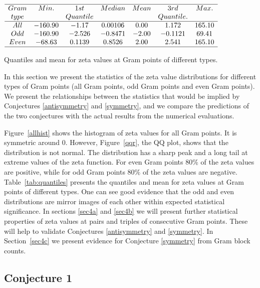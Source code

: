 \documentclass[twoside]{article}
\begin{document}
\begin{table}
\centering \(\begin{array}{ccccccc}
\hline
 Gram &     Min.   & 1st    &  Median    &   Mean   & 3rd    &   Max. \\
 type &              & Quantile   &            &              & Quantile.    &   \\
\hline
All& -160.90 &   -1.17 &    0.00106 &   0.00  &  1.172 &165.10\\
Odd&-160.90 &   -2.526 &   -0.8471  & -2.00 &   -0.1121 &  69.41 \\
Even&-68.63 &   0.1139 &  0.8526  & 2.00 &   2.541 & 165.10 \\
\hline
\end{array}\)
\caption{Quantiles and mean for zeta values at Gram points of different types.} \label{tab:quantiles}
\end{table}

In this section we present the statistics of the zeta value distributions for different types of Gram points (all Gram points, odd Gram points and even Gram points). We present the relationships between the statistics that would be implied by Conjectures \ref{antisymmetry} and \ref{symmetry}, and we compare the predictions of the two conjectures with the actual results from the numerical evaluations. 

Figure~\ref{allhist} shows the histogram of zeta values for all Gram points. It  is symmetric around $0$. However, Figure~\ref{qqr}, the QQ plot, shows that the distribution is not normal. The distribution has a sharp peak and a long tail at extreme values of the zeta function. For even Gram points $80\%$ of the zeta values are positive, while for odd Gram points $80\%$ of the zeta values are negative. Table~\ref{tab:quantiles} presents the quantiles and mean for zeta values at Gram points of different types.  One can see good evidence that the odd and even distributions are mirror images of each other within expected statistical significance. In sections 
\ref{sec4a} and \ref{sec4b} we will present further statistical properties of zeta values at pairs and triples of consecutive Gram points. These will help to validate Conjectures  \ref{antisymmetry} and  \ref{symmetry}. In Section~\ref{sec4c} we present evidence for  Conjecture  \ref{symmetry} from Gram block counts.

\subsection{\label{sec4a}Conjecture 1}
\end{document}
